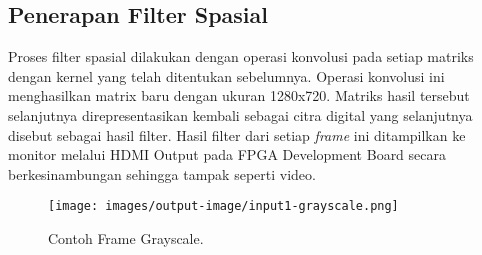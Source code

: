 

\subsection{Penerapan Filter Spasial}

Proses filter spasial dilakukan dengan operasi konvolusi pada setiap matriks dengan kernel yang telah ditentukan sebelumnya. Operasi konvolusi ini menghasilkan matrix baru dengan ukuran 1280x720. Matriks hasil tersebut selanjutnya direpresentasikan kembali sebagai citra digital yang selanjutnya disebut sebagai hasil filter. Hasil filter dari setiap \textit{frame} ini ditampilkan ke monitor melalui HDMI Output pada FPGA Development Board secara berkesinambungan sehingga tampak seperti video.

\begin{figure}[H]
    \texttt{[image: images/output-image/input1-grayscale.png]}
    \caption{Contoh Frame Grayscale.}
    \label{fig:input-grayscale}
\end{figure}

